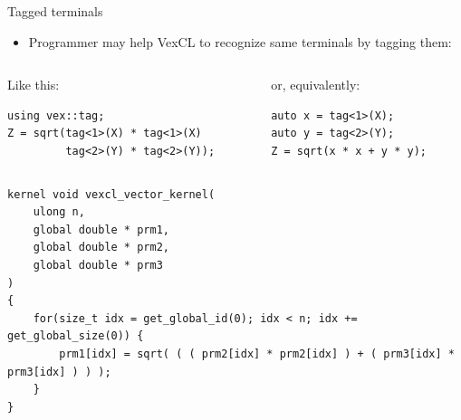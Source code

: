 \documentclass[@BEAMER_OPTIONS@]{beamer}
\begin{document}
\begin{frame}[fragile]{Tagged terminals}
    \begin{itemize}
        \item Programmer may help VexCL to recognize same terminals by
            tagging them:
    \end{itemize}
    \begin{columns}
        \begin{column}{0.48\textwidth}
            \begin{exampleblock}{Like this:}
                \begin{lstlisting}
using vex::tag;
Z = sqrt(tag<1>(X) * tag<1>(X)
         tag<2>(Y) * tag<2>(Y));
                \end{lstlisting}
            \end{exampleblock}
        \end{column}
        \begin{column}{0.48\textwidth}
            \begin{exampleblock}{or, equivalently:}
                \begin{lstlisting}
auto x = tag<1>(X);
auto y = tag<2>(Y);
Z = sqrt(x * x + y * y);
                \end{lstlisting}
            \end{exampleblock}
        \end{column}
    \end{columns}
    \begin{exampleblock}{}
        \begin{lstlisting}
kernel void vexcl_vector_kernel(
    ulong n,
    global double * prm1,
    global double * prm2,
    global double * prm3
)
{
    for(size_t idx = get_global_id(0); idx < n; idx += get_global_size(0)) {
        prm1[idx] = sqrt( ( ( prm2[idx] * prm2[idx] ) + ( prm3[idx] * prm3[idx] ) ) );
    }
}
        \end{lstlisting}
    \end{exampleblock}
\end{frame}
\end{document}
